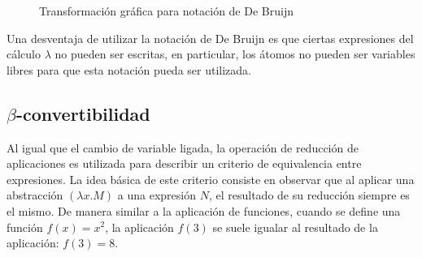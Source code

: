 \begin{figure}
  \centering
  \caption{Transformación gráfica para notación de De Bruijn}
  \label{fig:debrujn}
\end{figure}

Una desventaja de utilizar la notación de De Bruijn es que ciertas expresiones del cálculo \( λ \) no pueden ser escritas, en particular, los átomos no pueden ser variables libres para que esta notación pueda ser utilizada.

\subsection{\texorpdfstring{\( β \)-convertibilidad}{beta-convertibilidad}}
\label{sec:beta-convertibildad}

Al igual que el cambio de variable ligada, la operación de reducción de aplicaciones es utilizada para describir un criterio de equivalencia entre expresiones. La idea básica de este criterio consiste en observar que al aplicar una abstracción \( (λx.M) \) a una expresión \( N \), el resultado de su reducción siempre es el mismo. De manera similar a la aplicación de funciones, cuando se define una función \( f(x)=x^{2} \), la aplicación \( f(3) \) se suele igualar al resultado de la aplicación: \( f(3)=8 \).

